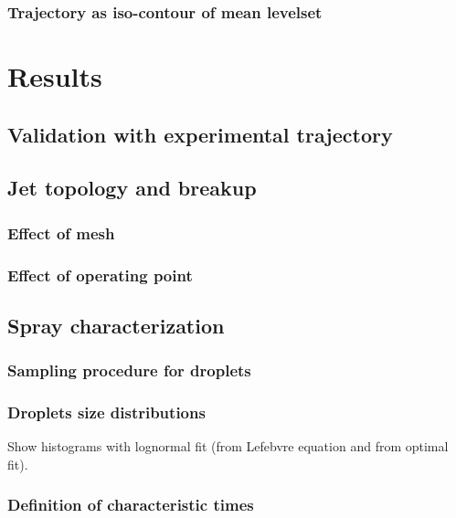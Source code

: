 \subsubsection*{Trajectory as iso-contour of mean levelset}





\section{Results}
\label{sec:results_JICF_resolved}

\subsection{Validation with experimental trajectory}

\subsection{Jet topology and breakup}

\subsubsection{Effect of mesh}

\subsubsection{Effect of operating point}

\subsection{Spray characterization}

\subsubsection{Sampling procedure for droplets}

\subsubsection{Droplets size distributions}

Show histograms with lognormal fit (from Lefebvre equation and from optimal fit).

\subsubsection{Definition of characteristic times}

